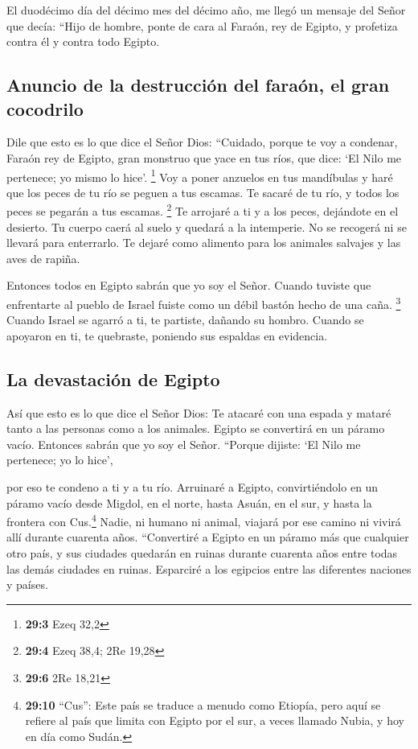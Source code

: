  El duodécimo día del décimo mes del décimo año, me llegó
un mensaje del Señor que decía:  ``Hijo de hombre, ponte
de cara al Faraón, rey de Egipto, y profetiza contra él y contra todo
Egipto.

\hypertarget{anuncio-de-la-destrucciuxf3n-del-farauxf3n-el-gran-cocodrilo}{%
\subsection{Anuncio de la destrucción del faraón, el gran
cocodrilo}\label{anuncio-de-la-destrucciuxf3n-del-farauxf3n-el-gran-cocodrilo}}

 Dile que esto es lo que dice el Señor Dios: ``Cuidado,
porque te voy a condenar, Faraón rey de Egipto, gran monstruo que yace
en tus ríos, que dice: `El Nilo me pertenece; yo mismo lo hice'.
\footnote{\textbf{29:3} Ezeq 32,2}  Voy a poner anzuelos
en tus mandíbulas y haré que los peces de tu río se peguen a tus
escamas. Te sacaré de tu río, y todos los peces se pegarán a tus
escamas. \footnote{\textbf{29:4} Ezeq 38,4; 2Re 19,28}  Te
arrojaré a ti y a los peces, dejándote en el desierto. Tu cuerpo caerá
al suelo y quedará a la intemperie. No se recogerá ni se llevará para
enterrarlo. Te dejaré como alimento para los animales salvajes y las
aves de rapiña.

 Entonces todos en Egipto sabrán que yo soy el Señor.
Cuando tuviste que enfrentarte al pueblo de Israel fuiste como un débil
bastón hecho de una caña. \footnote{\textbf{29:6} 2Re 18,21}
 Cuando Israel se agarró a ti, te partiste, dañando su
hombro. Cuando se apoyaron en ti, te quebraste, poniendo sus espaldas en
evidencia.

\hypertarget{la-devastaciuxf3n-de-egipto}{%
\subsection{La devastación de
Egipto}\label{la-devastaciuxf3n-de-egipto}}

 Así que esto es lo que dice el Señor Dios: Te atacaré con
una espada y mataré tanto a las personas como a los animales.
 Egipto se convertirá en un páramo vacío. Entonces sabrán
que yo soy el Señor. ``Porque dijiste: `El Nilo me pertenece; yo lo
hice',

 por eso te condeno a ti y a tu río. Arruinaré a Egipto,
convirtiéndolo en un páramo vacío desde Migdol, en el norte, hasta
Asuán, en el sur, y hasta la frontera con Cus.\footnote{\textbf{29:10}
  ``Cus'': Este país se traduce a menudo como Etiopía, pero aquí se
  refiere al país que limita con Egipto por el sur, a veces llamado
  Nubia, y hoy en día como Sudán.}  Nadie, ni humano ni
animal, viajará por ese camino ni vivirá allí durante cuarenta años.
 ``Convertiré a Egipto en un páramo más que cualquier
otro país, y sus ciudades quedarán en ruinas durante cuarenta años entre
todas las demás ciudades en ruinas. Esparciré a los egipcios entre las
diferentes naciones y países.

